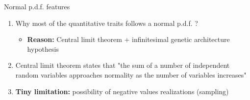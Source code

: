 \documentclass{beamer}
\begin{document}
\begin{frame}{Normal p.d.f. features}
  \begin{enumerate}
  
  \item<1-> Why most of the quantitative traits follows a normal p.d.f. ?
  \vspace{0.2cm}
  
  \begin{itemize}
    \item \textbf{Reason:} Central limit theorem + infinitesimal genetic architecture hypothesis 
  \end{itemize}
  \vspace{0.2cm}
   
  \item<2-> Central limit theorem states that "the sum of a number of independent random variables approaches normality as the number of variables increases"
  \vspace{0.2cm}
  
  \item<3-> \textbf{Tiny limitation:} possibility of negative values realizations (sampling)
  \vspace{0.2cm}  
           
  \end{enumerate}
    
\end{frame}

\end{document}
